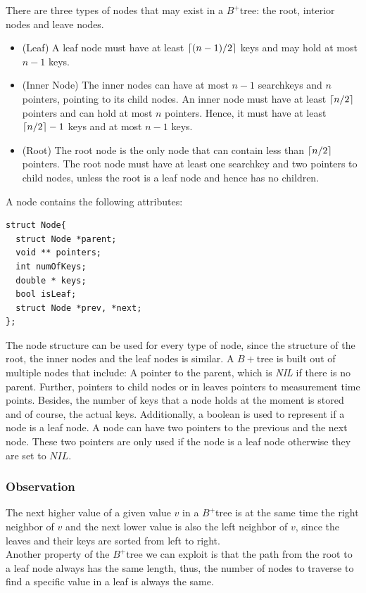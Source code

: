 \documentclass[abstracton,12pt,oneside]{scrreprt}
\DeclarePairedDelimiter\ceil{\lceil}{\rceil}
\begin{document}
There are three types of nodes that may exist in a $B^+$tree: the root, interior nodes and leave nodes.
\begin{itemize}
	\item (Leaf) A leaf node must have at least $\ceil{(n-1)/2}$ keys and may hold at most $n-1$ keys.
	\item (Inner Node) The inner nodes can have at most $n-1$ searchkeys and $n$ pointers, pointing to its child nodes. An inner node must have at least $\ceil{n/2}$ pointers and can hold at most $n$ pointers. Hence, it must have at least $\ceil{n/2}-1$ keys and at most $n-1$ keys.
	\item (Root) The root node is the only node that can contain less than $\ceil{n/2}$ pointers. The root node must have at least one searchkey and two pointers to child nodes, unless the root is a leaf node and hence has no children.
\end{itemize}



A node contains the following attributes: 
\lstset{language=C}
\begin{lstlisting}
struct Node{
  struct Node *parent;
  void ** pointers;
  int numOfKeys;
  double * keys;
  bool isLeaf;
  struct Node *prev, *next;
};
\end{lstlisting}
\BlankLine
The node structure can be used for every type of node, since the structure of the root, the inner nodes and the leaf nodes is similar. A $B+$tree is built out of multiple nodes that include: A pointer to the parent, which is \emph{NIL} if there is no parent. Further, pointers to child nodes or in leaves pointers to measurement time points. Besides, the number of keys that a node holds at the moment is stored and of course, the actual keys. Additionally, a boolean is used to represent if a node is a leaf node. A node can have two pointers to the previous and the next node. These two pointers are only used if the node is a leaf node otherwise they are set to $NIL$.

\subsubsection{Observation}
The next higher value of a given value $v$ in a $B^+$tree is at the same time the right neighbor of $v$ and the next lower value is also the left neighbor of $v$, since the leaves and their keys are sorted from left to right.\\
Another property of the $B^+$tree we can exploit is that the path from the root to a leaf node always has the same length, thus, the number of nodes to traverse to find a specific value in a leaf is always the same. 
\end{document}
